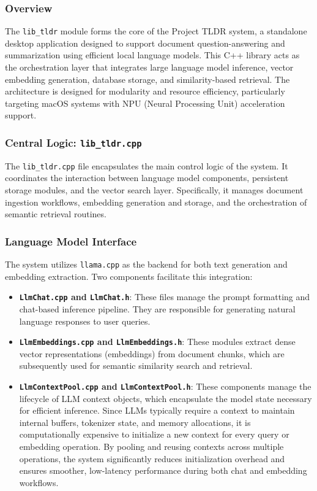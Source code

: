 \subsubsection{Overview}

The \texttt{lib\_tldr} module forms the core of the Project TLDR system, a standalone desktop application designed to support document question-answering and summarization using efficient local language models. This C++ library acts as the orchestration layer that integrates large language model inference, vector embedding generation, database storage, and similarity-based retrieval. The architecture is designed for modularity and resource efficiency, particularly targeting macOS systems with NPU (Neural Processing Unit) acceleration support.



\subsubsection{Central Logic: \texttt{lib\_tldr.cpp}}

The \texttt{lib\_tldr.cpp} file encapsulates the main control logic of the system. It coordinates the interaction between language model components, persistent storage modules, and the vector search layer. Specifically, it manages document ingestion workflows, embedding generation and storage, and the orchestration of semantic retrieval routines.

\subsubsection{Language Model Interface}

The system utilizes \texttt{llama.cpp} as the backend for both text generation and embedding extraction. Two components facilitate this integration:

\begin{itemize}
    \item \textbf{\texttt{LlmChat.cpp} and \texttt{LlmChat.h}}: These files manage the prompt formatting and chat-based inference pipeline. They are responsible for generating natural language responses to user queries.
    \item \textbf{\texttt{LlmEmbeddings.cpp} and \texttt{LlmEmbeddings.h}}: These modules extract dense vector representations (embeddings) from document chunks, which are subsequently used for semantic similarity search and retrieval.
    
    \item \textbf{\texttt{LlmContextPool.cpp} and \texttt{LlmContextPool.h}}: These components manage the lifecycle of LLM context objects, which encapsulate the model state necessary for efficient inference. Since LLMs typically require a context to maintain internal buffers, tokenizer state, and memory allocations, it is computationally expensive to initialize a new context for every query or embedding operation. By pooling and reusing contexts across multiple operations, the system significantly reduces initialization overhead and ensures smoother, low-latency performance during both chat and embedding workflows.
\end{itemize}

